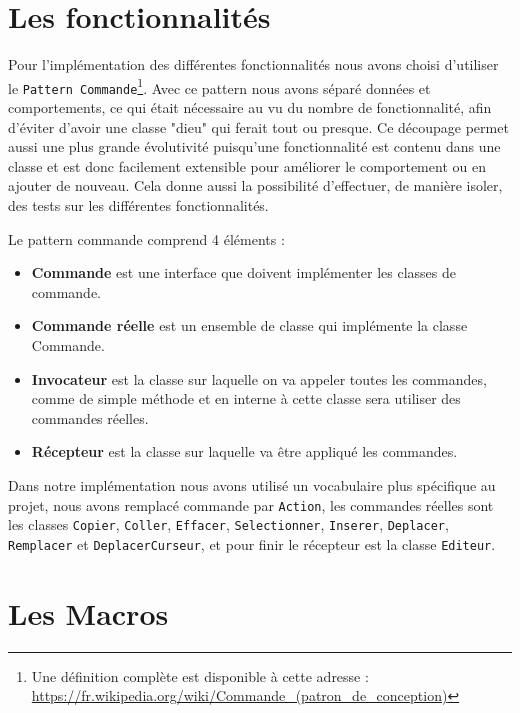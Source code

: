 \documentclass[french]{article}
\begin{document}
\section{Les fonctionnalités}\label{sec:fonctionnalités}
Pour l'implémentation des différentes fonctionnalités nous avons choisi d'utiliser le \texttt{Pattern Commande}\footnote{Une définition complète est disponible à cette adresse : \url{https://fr.wikipedia.org/wiki/Commande_(patron_de_conception)}}. Avec ce pattern nous avons séparé données et comportements, ce qui était nécessaire au vu du nombre de fonctionnalité, afin d'éviter d'avoir une classe "dieu" qui ferait tout ou presque. Ce découpage permet aussi une plus grande évolutivité puisqu'une fonctionnalité est contenu dans une classe et est donc facilement extensible pour améliorer le comportement ou en ajouter de nouveau. Cela donne aussi la possibilité d'effectuer, de manière isoler, des tests sur les différentes fonctionnalités.

Le pattern commande comprend 4 éléments :
\begin{itemize}
	\item \textbf{Commande} est une interface que doivent implémenter les classes de commande.
	\item \textbf{Commande réelle} est un ensemble de classe qui implémente la classe Commande.
	\item \textbf{Invocateur} est la classe sur laquelle on va appeler toutes les commandes, comme de simple méthode et en interne à cette classe sera utiliser des commandes réelles.
	\item \textbf{Récepteur} est la classe sur laquelle va être appliqué les commandes.
\end{itemize}

Dans notre implémentation nous avons utilisé un vocabulaire plus spécifique au projet, nous avons remplacé commande par \texttt{Action}, les commandes réelles sont les classes \texttt{Copier}, \texttt{Coller}, \texttt{Effacer}, \texttt{Selectionner}, \texttt{Inserer}, \texttt{Deplacer}, \texttt{Remplacer} et \texttt{DeplacerCurseur}, et pour finir le récepteur est la classe \texttt{Editeur}.

\section{Les Macros}\label{sec:macros}
\end{document}
